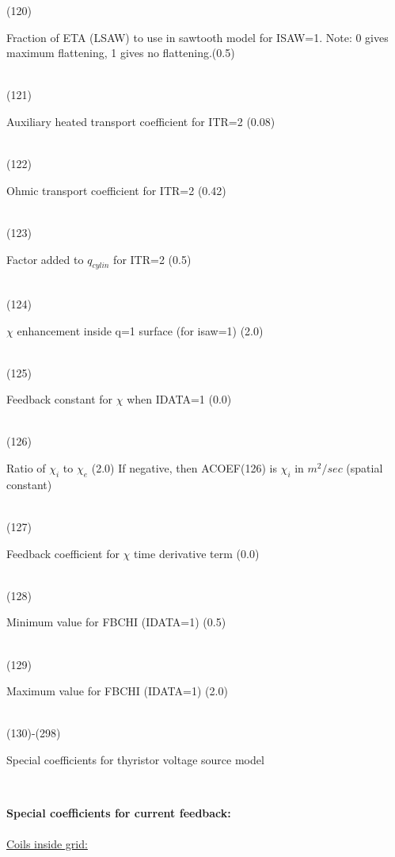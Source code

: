 \begin{tabbing}
(120) \> \parbox[t]{\width}{Fraction of ETA (LSAW) to use in sawtooth model for ISAW=1.
     Note: 0 gives maximum flattening, 1 gives no flattening.(0.5)}\\
(121) \> \parbox[t]{\width}{Auxiliary heated transport coefficient for ITR=2 (0.08)}\\
(122) \> \parbox[t]{\width}{Ohmic transport coefficient for ITR=2 (0.42)}\\
(123) \> \parbox[t]{\width}{Factor added to $q_{cylin}$ for ITR=2 (0.5)}\\
(124) \> \parbox[t]{\width}{$\chi$ enhancement inside q=1 surface (for isaw=1) (2.0)}\\
(125) \> \parbox[t]{\width}{Feedback constant for $\chi$ when IDATA=1 (0.0)}\\
(126) \> \parbox[t]{\width}{Ratio of $\chi_i$ to $\chi_e$ (2.0)  If
negative, then ACOEF(126) is $\chi_i$ in $m^2/sec$ (spatial constant)}\\
(127) \> \parbox[t]{\width}{Feedback coefficient for $\chi$ time derivative term (0.0)}\\
(128) \> \parbox[t]{\width}{Minimum value for FBCHI (IDATA=1) (0.5)}\\
(129) \> \parbox[t]{\width}{Maximum value for FBCHI (IDATA=1) (2.0)}\\
(130)-(298) \> \parbox[t]{\width}{Special coefficients for thyristor voltage source model}\\
\end{tabbing}
{\bf Special coefficients for current feedback:} \\
 \\
\label{p:vback}
\underline{Coils inside grid:} \\
